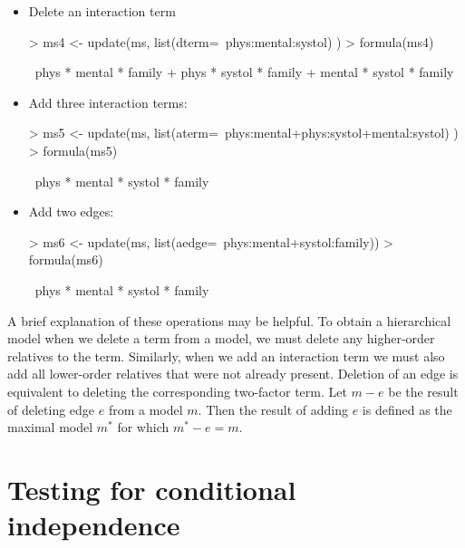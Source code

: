\documentclass[12pt]{article}
\begin{document}
\begin{itemize}
\item Delete an interaction term

\begin{Schunk}
\begin{Sinput}
> ms4 <- update(ms, list(dterm=~phys:mental:systol) )
> formula(ms4)
\end{Sinput}
\begin{Soutput}
~phys * mental * family + phys * systol * family + mental * systol * 
    family
\end{Soutput}
\end{Schunk}

\item Add three interaction terms:

\begin{Schunk}
\begin{Sinput}
> ms5 <- update(ms, list(aterm=~phys:mental+phys:systol+mental:systol) )
> formula(ms5)
\end{Sinput}
\begin{Soutput}
~phys * mental * systol * family
\end{Soutput}
\end{Schunk}

\item Add two edges:

\begin{Schunk}
\begin{Sinput}
> ms6 <- update(ms, list(aedge=~phys:mental+systol:family))
> formula(ms6)
\end{Sinput}
\begin{Soutput}
~phys * mental * systol * family
\end{Soutput}
\end{Schunk}
\end{itemize}

A brief explanation of these operations may be helpful. To obtain a hierarchical model when
we delete a term from a model, we must delete any higher-order relatives to the term.
Similarly, when we add an interaction term we must also add all lower-order relatives that
were not already present. Deletion of an edge is equivalent to deleting the corresponding
two-factor term. Let $m-e$ be the result of deleting edge $e$ from a model $m$. Then the
result of adding $e$ is defined as the maximal model $m^*$ for which $m^*-e=m$.



\section{Testing for conditional independence}
\label{sec:citest}
\end{document}
